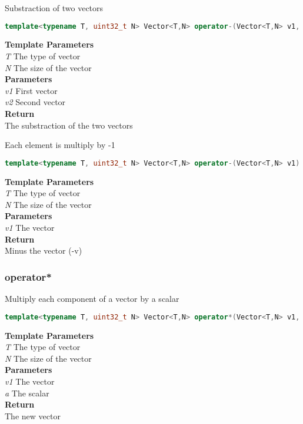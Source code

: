\begin{mdframed}
Substraction of two vectors
\begin{lstlisting}[language=C++]
template<typename T, uint32_t N> Vector<T,N> operator-(Vector<T,N> v1, const Vector<T,N>& v2) 
\end{lstlisting}
\textbf{Template Parameters} \\ 
\textit{T} The type of vector \\ 
\textit{N} The size of the vector \\ 
\textbf{Parameters} \\ 
\textit{v1} First vector \\ 
\textit{v2} Second vector \\ 
\textbf{Return} \\ 
The substraction of the two vectors\\ 
\end{mdframed}

\begin{mdframed}
Each element is multiply by -1
\begin{lstlisting}[language=C++]
template<typename T, uint32_t N> Vector<T,N> operator-(Vector<T,N> v1) 
\end{lstlisting}
\textbf{Template Parameters} \\ 
\textit{T} The type of vector \\ 
\textit{N} The size of the vector \\ 
\textbf{Parameters} \\ 
\textit{v1} The vector \\ 
\textbf{Return} \\ 
Minus the vector (-v)\\ 
\end{mdframed}

\subsubsection{operator*}
\begin{mdframed}
Multiply each component of a vector by a scalar
\begin{lstlisting}[language=C++]
template<typename T, uint32_t N> Vector<T,N> operator*(Vector<T,N> v1, T a) 
\end{lstlisting}
\textbf{Template Parameters} \\ 
\textit{T} The type of vector \\ 
\textit{N} The size of the vector \\ 
\textbf{Parameters} \\ 
\textit{v1} The vector \\ 
\textit{a} The scalar \\ 
\textbf{Return} \\ 
The new vector\\ 
\end{mdframed}

